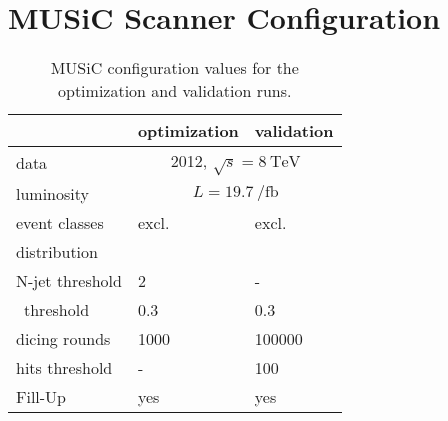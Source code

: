 \section*{MUSiC Scanner Configuration}
\begin{table}
	\centering
	\begin{tabular}{ l l l }
		\toprule
		& optimization & validation \\ 
		\midrule
		data & \multicolumn{2}{c|}{2012, $\sqrt{s} = \SI{8}{\TeV}$} \\ 
		luminosity & \multicolumn{2}{c|}{ $L = \SI{19.7}{\per\femto\barn}$ } \\ 
		\midrule
		event classes & excl. & excl. \\ 
		distribution & \sumpT & \Minv \\
		N-jet threshold & \num{2} & - \\
		\p~threshold & \num{0.3} & \num{0.3} \\
		dicing rounds & \num{1000} & \num{100000} \\
		hits threshold & - & \num{100} \\
		Fill-Up & yes & yes \\
		\bottomrule
	\end{tabular}
	\caption{MUSiC configuration values for the optimization and validation runs.}
	\label{tbl:music_configuration}
\end{table}

\newpage
